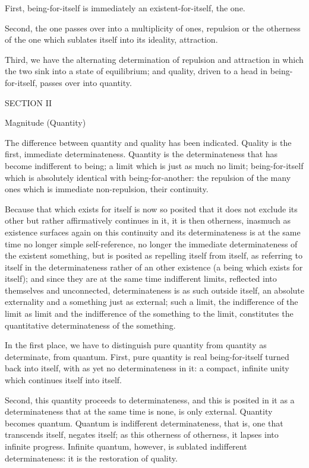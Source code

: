 First, being-for-itself is immediately
an existent-for-itself, the one.

Second, the one passes over into a multiplicity of ones,
repulsion or the otherness of the one
which sublates itself into its ideality, attraction.

Third, we have the alternating
determination of repulsion and attraction
in which the two sink into a state of equilibrium;
and quality, driven to a head in being-for-itself,
passes over into quantity.

SECTION II

Magnitude (Quantity)

The difference between quantity and quality has been indicated.
Quality is the first, immediate determinateness.
Quantity is the determinateness that
has become indifferent to being;
a limit which is just as much no limit;
being-for-itself which is absolutely
identical with being-for-another:
the repulsion of the many ones
which is immediate non-repulsion,
their continuity.

Because that which exists for itself is now so posited
that it does not exclude its other
but rather affirmatively continues in it,
it is then otherness, inasmuch as
existence surfaces again on this continuity
and its determinateness is at the same time
no longer simple self-reference,
no longer the immediate determinateness
of the existent something,
but is posited as repelling itself from itself,
as referring to itself in the determinateness
rather of an other existence
(a being which exists for itself);
and since they are at the same time indifferent limits,
reflected into themselves and unconnected,
determinateness is as such outside itself,
an absolute externality and a something just as external;
such a limit, the indifference of the limit as limit
and the indifference of the something to the limit,
constitutes the quantitative determinateness of the something.

In the first place, we have to distinguish pure quantity
from quantity as determinate, from quantum.
First, pure quantity is real being-for-itself
turned back into itself, with as yet no determinateness in it:
a compact, infinite unity which continues itself into itself.

Second, this quantity proceeds to determinateness,
and this is posited in it as a determinateness
that at the same time is none, is only external.
Quantity becomes quantum.
Quantum is indifferent determinateness,
that is, one that transcends itself, negates itself;
as this otherness of otherness, it lapses into infinite progress.
Infinite quantum, however, is sublated indifferent determinateness:
it is the restoration of quality.

